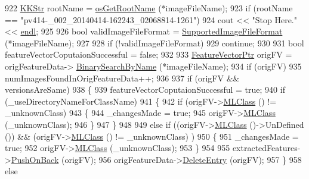 \begin{DoxyCode}
922     \hyperlink{class_k_k_b_1_1_k_k_str}{KKStr}  rootName = \hyperlink{namespace_k_k_b_af5b668ed9902d7f93b62529664a739f0}{osGetRootName} (*imageFileName);
923     \textcolor{keywordflow}{if}  (rootName == \textcolor{stringliteral}{"pv414-\_002\_20140414-162243\_02068814-1261"})
924       cout << \textcolor{stringliteral}{"Stop Here."} << \hyperlink{namespace_k_k_b_ad1f50f65af6adc8fa9e6f62d007818a8}{endl};
925 
926     \textcolor{keywordtype}{bool} validImageFileFormat = \hyperlink{namespace_k_k_b_a8cc2b9d78aae6ffccb1d2c625f471f90}{SupportedImageFileFormat} (*imageFileName);
927     
928     \textcolor{keywordflow}{if}  (!validImageFileFormat)
929       \textcolor{keywordflow}{continue};
930 
931     \textcolor{keywordtype}{bool}  featureVectorCoputaionSuccessful = \textcolor{keyword}{false};
932 
933     \hyperlink{class_k_k_m_l_l_1_1_feature_vector}{FeatureVectorPtr}  origFV = origFeatureData->
      \hyperlink{class_k_k_m_l_l_1_1_feature_vector_list_a33a695d38d4b2ad71048f3c0b75f554a}{BinarySearchByName} (*imageFileName);
934     \textcolor{keywordflow}{if}  (origFV)
935       numImagesFoundInOrigFeatureData++;
936 
937     \textcolor{keywordflow}{if}  (origFV  &&  versionsAreSame)
938     \{
939       featureVectorCoputaionSuccessful = \textcolor{keyword}{true};
940       \textcolor{keywordflow}{if}  (\_useDirectoryNameForClassName)
941       \{
942         \textcolor{keywordflow}{if}  (origFV->\hyperlink{class_k_k_m_l_l_1_1_feature_vector_a3c8fe002c6e868f8c00059c004fb32fd}{MLClass} () != \_unknownClass)
943         \{
944           \_changesMade = \textcolor{keyword}{true};
945           origFV->\hyperlink{class_k_k_m_l_l_1_1_feature_vector_a3c8fe002c6e868f8c00059c004fb32fd}{MLClass} (\_unknownClass);
946         \}
947       \}
948 
949       \textcolor{keywordflow}{else} \textcolor{keywordflow}{if}  ((origFV->\hyperlink{class_k_k_m_l_l_1_1_feature_vector_a3c8fe002c6e868f8c00059c004fb32fd}{MLClass} ()->UnDefined ())  &&  (origFV->\hyperlink{class_k_k_m_l_l_1_1_feature_vector_a3c8fe002c6e868f8c00059c004fb32fd}{MLClass} () != \_unknownClass)
      )
950       \{
951         \_changesMade = \textcolor{keyword}{true};
952         origFV->\hyperlink{class_k_k_m_l_l_1_1_feature_vector_a3c8fe002c6e868f8c00059c004fb32fd}{MLClass} (\_unknownClass);
953       \}
954 
955       extractedFeatures->\hyperlink{class_k_k_m_l_l_1_1_feature_vector_list_abd43779a90a6aa3db1de8092be877bdb}{PushOnBack} (origFV);
956       origFeatureData->\hyperlink{class_k_k_b_1_1_k_k_queue_ae362e3b0a128e8a09182e167befda088}{DeleteEntry} (origFV);
957     \}
958     \textcolor{keywordflow}{else}

\end{DoxyCode}
